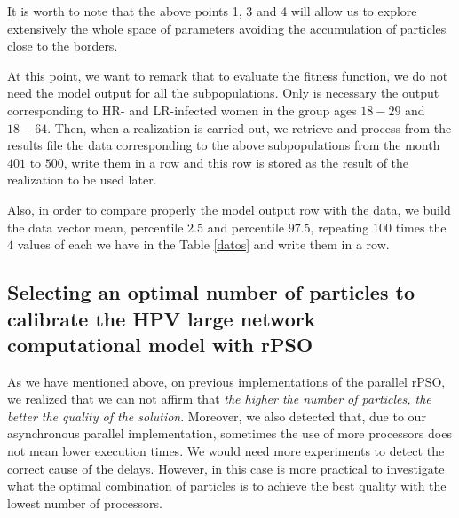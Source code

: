 It is worth to note that the above points 1, 3 and 4 will allow us to explore extensively the whole space of parameters avoiding the accumulation of particles close to the borders. 

\begin{remark}\label{mo}
At this point, we want to remark that to evaluate the fitness function, we do not need the model output for all the subpopulations. Only is necessary the output corresponding to HR- and LR-infected women in the group ages $18-29$ and $18-64$. Then, when a realization is carried out, we retrieve and process from the results file the data corresponding to the above subpopulations from the month $401$ to $500$, write them in a row and this row is stored as the result of the realization to be used later. 

Also, in order to compare properly the model output row with the data, we build the data vector mean, percentile $2.5$ and percentile $97.5$, repeating $100$ times the $4$ values of each we have in the Table \ref{datos} and write them in a row.
\end{remark}

\subsection{Selecting an optimal number of particles to calibrate the HPV large network computational model with rPSO}
As we have mentioned above, on previous implementations of the parallel rPSO, we realized that we can not affirm that \textit{the higher the number of particles, the better the quality of the solution}. Moreover, we also detected that, due to our asynchronous parallel implementation, sometimes the use of more processors does not mean lower execution times. We would need more experiments to detect the correct cause of the delays. However, in this case is more practical to investigate what the optimal combination of particles is to achieve the best quality with the lowest number of processors.

